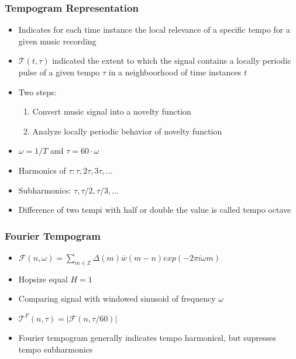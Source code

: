 \documentclass{scrartcl}
\begin{document}
\subsubsection*{Tempogram Representation}
\begin{itemize}
    \item
	Indicates for each time instance the local relevance of a specific tempo for a given music recording
    \item
	$\mathcal{T}(t, \tau)$ indicated the extent to which the signal contains a locally periodic pulse of a given tempo $\tau$ in a neighboorhood of time instances $t$
    \item
	Two steps:
	\begin{enumerate}
	    \item
		Convert music signal into a novelty function
	    \item
		Analyze locally periodic behavior of novelty function
	\end{enumerate}
    \item
	$\omega = 1/T$ and $\tau = 60 \cdot \omega$
    \item
	Harmonics of $\tau: \tau, 2\tau, 3\tau, ...$
    \item
	Subharmonics: $\tau, \tau /2, \tau /3, ...$
    \item
	Difference of two tempi with half or double the value is called tempo octave
\end{itemize}

\subsubsection*{Fourier Tempogram}
\begin{itemize}
    \item
	$\mathcal{F}(n,\omega) = \sum_{m\in \mathbb{Z}} \Delta(m) \overline{w}(m - n) exp(-2\pi i \omega m)$
    \item
	Hopsize equal $H=1$
    \item
	Comparing signal with windowed sinusoid of frequency $\omega$
    \item
	$\mathcal{T}^F (n,\tau) = |\mathcal{F}(n,\tau /60)|$
    \item
	Fourier tempogram generally indicates tempo harmonicsl, but supresses tempo subharmonics
\end{itemize}
\end{document}
